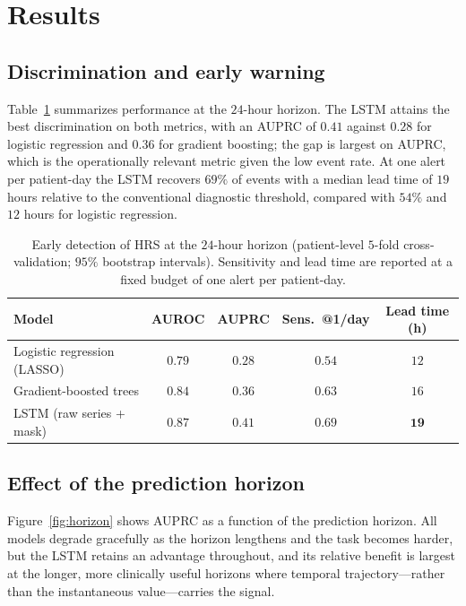\documentclass{article}
\begin{document}
\section{Results}

\subsection{Discrimination and early warning}

Table~\ref{tab:main} summarizes performance at the $24$-hour horizon. The LSTM
attains the best discrimination on both metrics, with an AUPRC of $0.41$ against
$0.28$ for logistic regression and $0.36$ for gradient boosting; the gap is largest
on AUPRC, which is the operationally relevant metric given the low event rate. At
one alert per patient-day the LSTM recovers $69\%$ of events with a median lead time
of $19$ hours relative to the conventional diagnostic threshold, compared with
$54\%$ and $12$ hours for logistic regression.

\begin{table}[t]
\caption{Early detection of HRS at the $24$-hour horizon (patient-level $5$-fold
cross-validation; $95\%$ bootstrap intervals). Sensitivity and lead time are
reported at a fixed budget of one alert per patient-day.}
\label{tab:main}
\centering
\small
\begin{tabular}{lcccc}
\toprule
Model & AUROC & AUPRC & Sens.\ @1/day & Lead time (h) \\
\midrule
Logistic regression (LASSO) & $0.79$ & $0.28$ & $0.54$ & $12$ \\
Gradient-boosted trees      & $0.84$ & $0.36$ & $0.63$ & $16$ \\
LSTM (raw series + mask)    & $\mathbf{0.87}$ & $\mathbf{0.41}$ & $\mathbf{0.69}$ & $\mathbf{19}$ \\
\bottomrule
\end{tabular}
\end{table}

\subsection{Effect of the prediction horizon}

Figure~\ref{fig:horizon} shows AUPRC as a function of the prediction horizon. All
models degrade gracefully as the horizon lengthens and the task becomes harder, but
the LSTM retains an advantage throughout, and its relative benefit is largest at
the longer, more clinically useful horizons where temporal trajectory---rather than
the instantaneous value---carries the signal.
\end{document}
